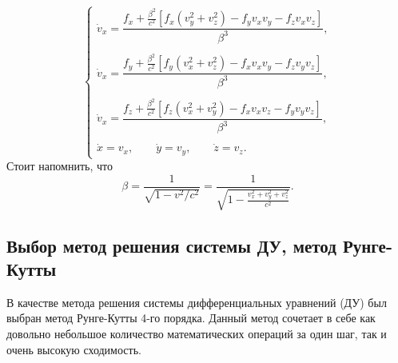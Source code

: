 \begin{equation}
\begin{cases}
\dot{v}_x = \dfrac{f_x  + \frac{\beta^2}{c^2} \left[ f_x \left(v_y^2 + v_z^2\right) - f_y v_x v_y  - f_z v_x v_z  \right] }{\beta^3 }, \\ \\

\dot{v}_x = \dfrac{f_y  + \frac{\beta^2}{c^2} \left[ f_y \left(v_x^2 + v_z^2\right) - f_x v_x v_y  - f_z v_y v_z  \right] }{\beta^3}, \\ \\

\dot{v}_x = \dfrac{f_z  + \frac{\beta^2}{c^2} \left[ f_z \left(v_x^2 + v_y^2\right) - f_x v_x v_z  - f_y v_y v_z  \right] }{\beta^3}, \\ \\

\dot{x} = v_x, \qquad \dot{y} = v_y, \qquad \dot{z} = v_z.
\end{cases}
\label{eq:style2}
\end{equation}
Стоит напомнить, что
\begin{equation*}
\beta = \frac{1}{\sqrt{1 - v^2/c^2}} = \frac{1}{\sqrt{1 - \frac{v_x^2 + v_y^2 + v_z^2}{c^2}}}.
\end{equation*}


\subsection{Выбор метод решения системы ДУ, метод Рунге-Кутты}

В качестве метода решения системы дифференциальных уравнений (ДУ) был выбран метод Рунге-Кутты 4-го порядка. Данный метод сочетает в себе как довольно небольшое количество математических операций за один шаг, так и очень высокую сходимость\cite{butcher1987numerical}.

